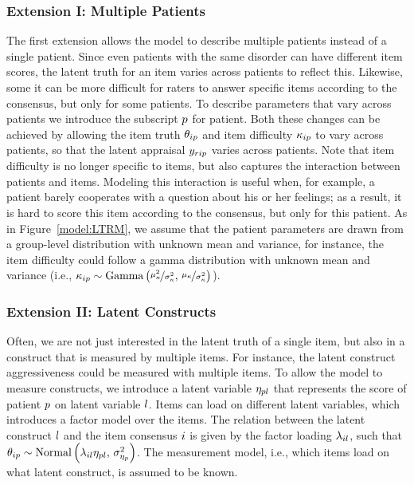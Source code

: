 \documentclass[a4paper,usenames,dvipsnames]{article}
\begin{document}
\subsubsection*{Extension I: Multiple Patients}
The first extension allows the model to describe multiple patients instead of a single patient. Since even patients with the same disorder can have different item scores, the latent truth for an item varies across patients to reflect this. Likewise, some it can be more difficult for raters to answer specific items according to the consensus, but only for some patients. To describe parameters that vary across patients we introduce the subscript $p$ for patient. Both these changes can be achieved by allowing the item truth $\theta_{ip}$ and item difficulty $\kappa_{ip}$ to vary across patients, so that the latent appraisal $y_{rip}$ varies across patients. Note that item difficulty is no longer specific to items, but also captures the interaction between patients and items. Modeling this interaction is useful when, for example, a patient barely cooperates with a question about his or her feelings; as a result, it is hard to score this item according to the consensus, but only for this patient. As in Figure~\ref{model:LTRM}, we assume that the patient parameters are drawn from a group-level distribution with unknown mean and variance, for instance, the item difficulty could follow a gamma distribution with unknown mean and variance (i.e., $\kappa_{ip} \sim \text{Gamma}\left(\nicefrac{\mu_\kappa^2}{\sigma_\kappa^2},\,\nicefrac{\mu_\kappa}{\sigma_\kappa^2}\right)$).

\subsubsection*{Extension II: Latent Constructs}
Often, we are not just interested in the latent truth of a single item, but also in a construct that is measured by multiple items. For instance, the latent construct aggressiveness could be measured with multiple items. To allow the model to measure constructs, we introduce a latent variable $\eta_{pl}$ that represents the score of patient $p$ on latent variable $l$. Items can load on different latent variables, which introduces a factor model over the items. The relation between the latent construct $l$ and the item consensus $i$ is given by the factor loading $\lambda_{il}$, such that $\theta_{ip} \sim \text{Normal}\left(\lambda_{il}\eta_{pl},\,\sigma^2_{\eta_{p}}\right)$. The measurement model, i.e., which items load on what latent construct, is assumed to be known.
\end{document}
